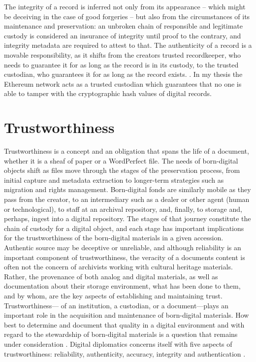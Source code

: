 The integrity of a record is inferred not only from its appearance – which might be deceiving in the case of good forgeries – but also from the circumstances of its maintenance and preservation: an unbroken chain of responsible and legitimate custody is considered an insurance of integrity until proof to the contrary, and integrity metadata are required to attest to that. The authenticity of a record is a movable responsibility, as it shifts from the creators trusted recordkeeper, who needs to guarantee it for as long as the record is in its custody, to the trusted custodian, who guarantees it for as long as the record exists. \cite[53]{duranti2009digital}. In my thesis the Ethereum network acts as a trusted custodian which guarantees that no one is able to tamper with the cryptographic hash values of digital records.

\section{Trustworthiness}
Trustworthiness is a concept and an obligation that spans the life of a document, whether it is a sheaf of paper or a WordPerfect file. The needs of born-digital objects shift as files move through the stages of the preservation process, from initial capture and metadata extraction to longer-term strategies such as migration and rights management. Born-digital fonds are similarly mobile as they pass from the creator, to an intermediary such as a dealer or other agent (human or technological), to staff at an archival repository, and, finally, to storage and, perhaps, ingest into a digital repository. The stages of that journey constitute the chain of custody for a digital object, and each stage has important implications for the trustworthiness of the born-digital materials in a given accession. Authentic source may be deceptive or unreliable, and although reliability is an important component of trustworthiness, the veracity of a documents content is often not the concern of archivists working with cultural heritage materials. Rather, the provenance of both analog and digital materials, as well as documentation about their storage environment, what has been done to them, and by whom, are the key aspects of establishing and maintaining trust. Trustworthiness— of an institution, a custodian, or a document—plays an important role in the acquisition and maintenance of born-digital materials. How best to determine and document that quality in a digital environment and with regard to the stewardship of born-digital materials is a question that remains under consideration \cite[27]{kirschenbaum2010digital}. 
Digital diplomatics concerns itself with five aspects of trustworthiness: reliability, authenticity, accuracy, integrity and authentication \cite[10]{kirschenbaum2010digital}.

